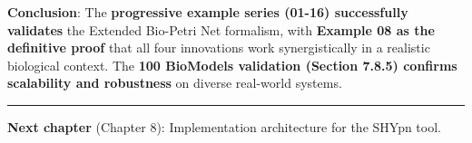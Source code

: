 \textbf{Conclusion}: The \textbf{progressive example series (01-16)
successfully validates} the Extended Bio-Petri Net formalism, with
\textbf{Example 08 as the definitive proof} that all four innovations
work synergistically in a realistic biological context. The \textbf{100 BioModels validation (Section 7.8.5) confirms scalability and robustness} on diverse real-world systems.

\begin{center}\rule{0.5\linewidth}{0.5pt}\end{center}

\textbf{Next chapter} (Chapter 8): Implementation architecture for the
SHYpn tool.
